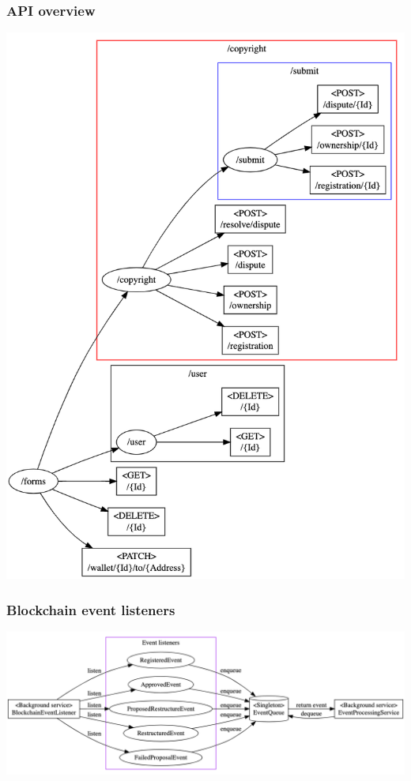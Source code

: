 \documentclass[12pt]{article}
\begin{document}
\subsubsection{API overview}
\includegraphics[width=\textwidth,height=\textheight,keepaspectratio]{images/operational/Forms-Api}

\subsubsection{Blockchain event listeners}
\includegraphics[width=\textwidth,height=\textheight,keepaspectratio]{images/operational/Event-Listening}
\end{document}
